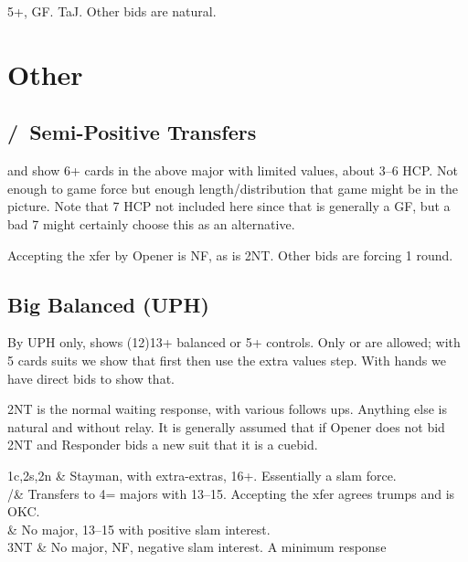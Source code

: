 \documentclass[main]{subfile}
\begin{document}
	5+\ddd, GF.  TaJ. Other bids are natural.
	
	\section{Other}
	
	\subsection{/\hhh ~Semi-Positive Transfers}	
		 and  show 6+ cards in the above major with limited values, about 3--6 HCP.  Not enough to game force but enough length/distribution that game might be in the picture.  Note that 7 HCP not included here since that is generally a GF, but a bad 7 might certainly choose this as an alternative.
		
		Accepting the xfer by Opener is NF, as is 2NT.  Other bids are forcing 1 round.
		
	\subsection{ Big Balanced (UPH)}
	
	By UPH only,  shows (12)13+ balanced or 5+ controls.  Only  or  are allowed; with 5 cards suits we show that first then use the extra values step.  With  hands we have direct bids to show that.
		
	2NT is the normal waiting response, with various follows ups.  Anything else is natural and without relay.  It is generally assumed that if Opener does not bid 2NT and Responder bids a new suit that it is a cuebid.
	
	\begin{bidtable}{1c,2s,2n}
		 & Stayman, with extra-extras, 16+.  Essentially a slam force. \\
		/\hhh& Transfers to 4= majors with 13--15. Accepting the xfer agrees trumps and is OKC. \\
		 & No major, 13--15 with positive slam interest. \\
		3NT & No major, NF, negative slam interest.  A minimum  response \\
	\end{bidtable}	

	
\end{document}

